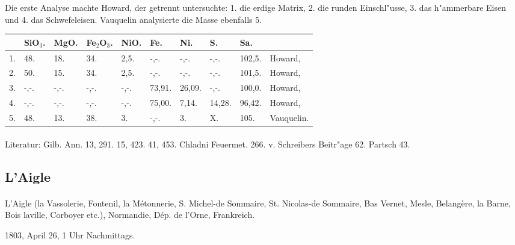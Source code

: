 \documentclass[a4paper, 11pt, oneside]{article}
\begin{document}
Die erste Analyse machte Howard, der getrennt untersuchte: 1. die erdige Matrix, 2. die runden Einschl"usse, 3. das h"ammerbare Eisen und 4. das Schwefeleisen. Vauquelin analysierte die Masse ebenfalls 5.
\begin{table}[!ht]
    \centering
    \footnotesize
    \begin{tabular}{l l l l l l l l l l}
         & SiO$_{3}$. & MgO. & Fe$_{2}$O$_{3}$. & NiO. & Fe. & Ni. & S. & Sa. &  \\ \hline
        1. & 48. & 18. & 34. & 2,5. & -,-. & -,-. & -,-. & 102,5. & Howard, \\
        2. & 50. & 15. & 34. & 2,5. & -,-. & -,-. & -,-. & 101,5. & Howard, \\
        3. & -,-. & -,-. & -,-. & -,-. & 73,91. & 26,09. & -,-. & 100,0. & Howard, \\
        4. & -,-. & -,-. & -,-. & -,-. & 75,00. & 7,14. & 14,28. & 96,42. & Howard, \\
        5. & 48. & 13. & 38. & 3. & -,-. & 3. & X. & 105. & Vauquelin. \\
    \end{tabular}
\end{table}
\footnotesize
\paragraph{}
Literatur: Gilb. Ann. 13, 291. 15, 423. 41, 453. Chladni Feuermet. 266. v. Schreibers Beitr"age 62. Partsch 43.
\subsection{L'Aigle}
\normalsize
\paragraph{}
L'Aigle (la Vassolerie, Fontenil, la Métonnerie, S. Michel-de Sommaire, St. Nicolas-de Sommaire, Bas Vernet, Mesle, Belangère, la Barne, Bois laville, Corboyer etc.), Normandie, Dép. de l'Orne, Frankreich.

1803, April 26, 1 Uhr Nachmittags.
\end{document}
